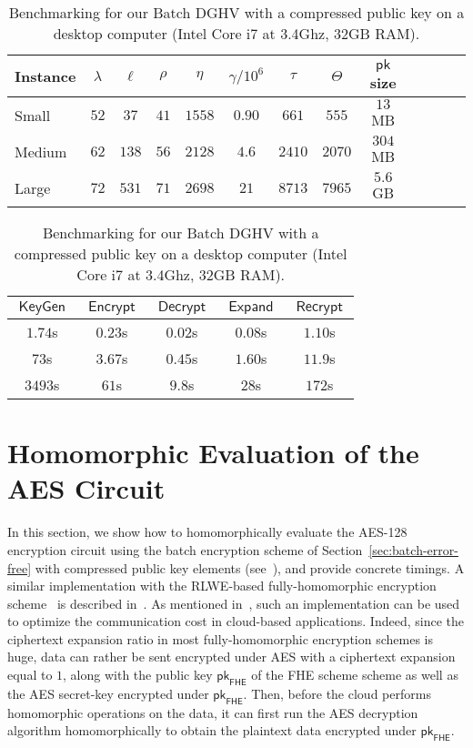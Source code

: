 \documentclass[11pt]{llncs}
\DeclareMathOperator{\KeyGen}{\ensuremath{\mathsf{KeyGen}}}
\DeclareMathOperator{\Expand}{\ensuremath{\mathsf{Expand}}}
\DeclareMathOperator{\Encrypt}{\ensuremath{\mathsf{Encrypt}}}
\DeclareMathOperator{\Decrypt}{\ensuremath{\mathsf{Decrypt}}}
\DeclareMathOperator{\Recrypt}{\ensuremath{\mathsf{Recrypt}}}
\DeclareMathOperator{\Mult}{\ensuremath{\mathsf{Mult}}}
\newcommand*{\pk}{\ensuremath{\mathsf{pk}}}
\newcommand*{\FHE}{\ensuremath{\mathsf{FHE}}}
\begin{document}
\begin{table}[tb]\scriptsize\centering

\caption{Benchmarking for our Batch DGHV with a compressed public key
  on a desktop computer (Intel Core i7 at 3.4Ghz, 32GB RAM).}
\label{t:concparams}
\begin{tabular}{|l|c|c||c|c|c|c|c|c|c|c|c||r|}
\hline 
\textbf{Instance}&$\lambda$&$\ell$&$\rho$&$\eta$&$\gamma/ 10^{6}$&$\tau$&$\Theta$&$\pk$ size\\
\hline
\hline
Small&$52$&$37$&$41$&$1558$&$0.90$&$661$&$555$&$13$ MB\\\hline
Medium&$62$&$138$&$56$&$2128$&$4.6$&$2410$&$2070$&$304$ MB\\\hline
Large&$72$&$531$&$71$&$2698$&$21$&$8713$&$7965$&$5.6$ GB\\\hline
\end{tabular}\begin{tabular}{||c|c|c|c|c|}
\hline 
$\KeyGen$&$\Encrypt$&$\Decrypt$&
$\Expand$ & $\Recrypt$\\
\hline
\hline
$1.74$s&$0.23$s&$0.02$s&
$0.08$s&$1.10$s\\\hline
$73$s&$3.67$s&$0.45$s&
$1.60$s&$11.9$s\\\hline
$3493$s&$61$s&$9.8$s&
$28$s&$172$s\\\hline
\end{tabular}
\end{table}


\section{Homomorphic Evaluation of the AES Circuit}
\label{sec:HAES}

In this section, we show how to homomorphically evaluate the AES-128
encryption circuit using the batch encryption scheme of Section~\ref{sec:batch-error-free} with compressed public key elements (see~\cite{CLT2013a}), and provide
concrete timings. A similar
implementation with
 the RLWE-based 
fully-homomorphic encryption scheme~\cite{BV2011a,BV2011b,GHS2012a} is
described in~\cite{GHS2012c}. 
As mentioned 
in~\cite{SV2011,NLV2011,GHS2012c}, such an implementation can be used to
optimize the communication cost in cloud-based
applications. Indeed, since the ciphertext expansion ratio in most
fully-homomorphic encryption schemes is huge, data can rather be sent
encrypted under AES with a ciphertext expansion equal to $1$, along
with the public key $\pk_{\FHE}$ of the FHE scheme scheme as well as
the AES secret-key 
encrypted under $\pk_{\FHE}$. Then, before the cloud performs homomorphic operations
on the data, it can first run the AES decryption algorithm
homomorphically to obtain the plaintext data encrypted under
$\pk_{\FHE}$.
\end{document}
